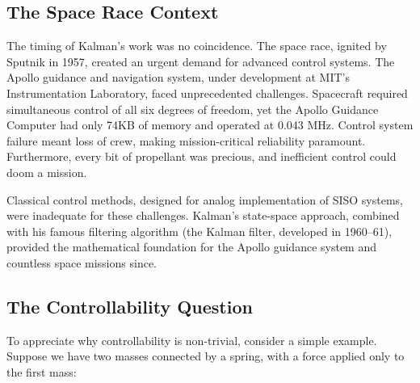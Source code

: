 \subsection{The Space Race Context}

The timing of Kalman's work was no coincidence. The space race, ignited by Sputnik in 1957, created an urgent demand for advanced control systems. The Apollo guidance and navigation system, under development at MIT's Instrumentation Laboratory, faced unprecedented challenges. Spacecraft required simultaneous control of all six degrees of freedom, yet the Apollo Guidance Computer had only 74KB of memory and operated at 0.043 MHz. Control system failure meant loss of crew, making mission-critical reliability paramount. Furthermore, every bit of propellant was precious, and inefficient control could doom a mission.

Classical control methods, designed for analog implementation of SISO systems, were inadequate for these challenges. Kalman's state-space approach, combined with his famous filtering algorithm (the Kalman filter, developed in 1960--61), provided the mathematical foundation for the Apollo guidance system and countless space missions since.

\subsection{The Controllability Question}

To appreciate why controllability is non-trivial, consider a simple example. Suppose we have two masses connected by a spring, with a force applied only to the first mass:

\begin{center}
\end{center}

